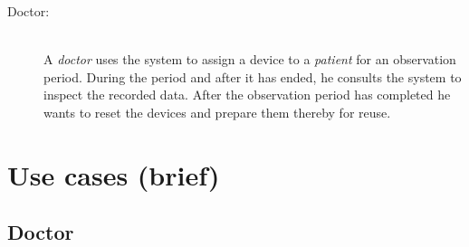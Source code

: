 \documentclass[fontsize=12pt,
               paper=a4,
               twoside=false,
               parskip=half,
               ]{scrartcl}
\begin{document}
\begin{description}

\item[Doctor:] \hfill \\
A \emph{doctor} uses the system to assign a device to a \emph{patient} for an observation period. During the period and after it has ended, he consults the system to inspect the recorded data. After the observation period has completed he wants to reset the devices and prepare them thereby for reuse.


\end{description}



\section{Use cases (brief)}

\subsection{Doctor}
\end{document}
